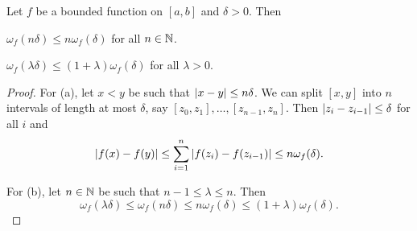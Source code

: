 \begin{lemma}\label{lem:omega}
    Let $f$ be a bounded function on $[a,b]$ and $\delta>0$. Then 
    \begin{thmenum}
        \item $\omega_f(n\delta)\leq n\omega_f(\delta)$ for all $n\in\mathbb{N}$. 
        \item $\omega_f(\lambda\delta)\leq (1+\lambda)\omega_f(\delta)$ for all $\lambda>0$.
    \end{thmenum}
\end{lemma}
\begin{proof}
    For (a), let $x<y$ be such that $\left\lvert {x-y} \right\rvert\leq n\delta$. We can split $[x,y]$ 
    into $n$ intervals of length at most $\delta$, say $[z_0,z_1],\ldots,[z_{n-1},z_n]$. 
    Then $\left\lvert {z_i - z_{i-1}} \right\rvert\leq\delta$ for all $i$ and 
    \begin{equation*}
        \left\lvert {f(x) - f(y)} \right\rvert \leq \sum_{i=1}^n\left\lvert {f(z_i) - f(z_{i-1})} \right\rvert \leq n\omega_f(\delta).
    \end{equation*}

    For (b), let $n\in\mathbb{N}$ be such that $n-1\leq\lambda\leq n$. Then 
    \begin{equation*}
        \omega_f(\lambda\delta) \leq \omega_f(n\delta) \leq n\omega_f(\delta) \leq (1+\lambda)\omega_f(\delta).
    \end{equation*}
\end{proof}

